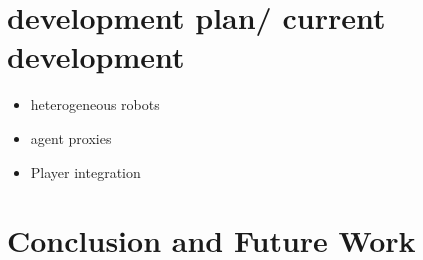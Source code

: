 \documentclass{llncs}
\begin{document}
\section{development plan/ current development}
\begin{itemize}
\item heterogeneous robots
\item agent proxies
\item Player integration
\end{itemize}

\section{Conclusion and Future Work}



\end{document}
